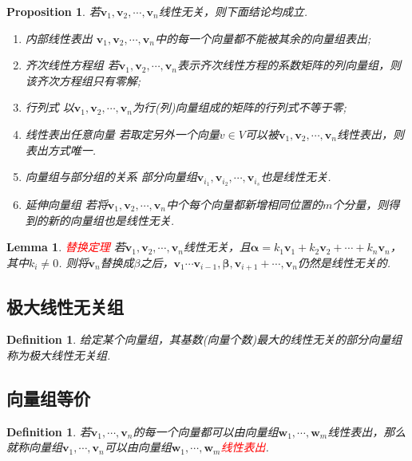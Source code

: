 \documentclass{article}
\newtheorem{lemma}[theorem]{Lemma}
\newtheorem{proposition}[theorem]{Proposition}
\newtheorem{definition}[theorem]{Definition}
\newcommand{\mbf}[1]{\bm{#1}}
\newcommand{\redt}[1]{\textcolor{red}{#1}}
\begin{document}
\begin{proposition}
\rm 若$\mbf{v}_1,\mbf{v}_2,\cdots,\mbf{v}_n$线性无关，则下面结论均成立.
\begin{enumerate}
	\item {\color{red} 内部线性表出} $\mbf{v}_1,\mbf{v}_2,\cdots,\mbf{v}_n$中的每一个向量都不能被其余的向量组表出;
	\item {\color{red} 齐次线性方程组} 若$\mbf{v}_1,\mbf{v}_2,\cdots,\mbf{v}_n$表示齐次线性方程的系数矩阵的列向量组，则该齐次方程组只有零解;
	\item {\color{red} 行列式} 以$\mbf{v}_1,\mbf{v}_2,\cdots,\mbf{v}_n$为行(列)向量组成的矩阵的行列式不等于零;
	\item {\color{red} 线性表出任意向量} 若取定另外一个向量$v \in V$可以被$\mbf{v}_1,\mbf{v}_2,\cdots,\mbf{v}_n$线性表出，则表出方式唯一.
	\item {\color{red} 向量组与部分组的关系} 部分向量组$\mbf{v}_{i_1},\mbf{v}_{i_2},\cdots,\mbf{v}_{i_s}$也是线性无关. 
	\item {\color{red} 延伸向量组} 若将$\mbf{v}_1,\mbf{v}_2,\cdots,\mbf{v}_n$中个每个向量都新增相同位置的$m$个分量，则得到的新的向量组也是线性无关.
\end{enumerate}
\end{proposition}

\begin{lemma}
\rm \redt{替换定理} 若$\mbf{v}_1,\mbf{v}_2,\cdots,\mbf{v}_n$线性无关，且$\mbf{\alpha} = k_1\mbf{v}_1 + k_2\mbf{v}_2 + \cdots+ k_n\mbf{v}_n$，其中$k_i \neq 0$. 则将$\mbf{v}_n$替换成$\beta$之后，$\mbf{v}_1 \cdots \mbf{v}_{i-1}, \mbf{\beta} ,\mbf{v}_{i+1} + \cdots,\mbf{v}_n$仍然是线性无关的. 
\end{lemma}

\subsection{极大线性无关组}

\begin{definition}
\rm 给定某个向量组，其基数(向量个数)最大的线性无关的部分向量组称为极大线性无关组.
\end{definition}

\subsection{向量组等价}

\begin{definition}
\rm 若$\mbf{v}_1,\cdots,\mbf{v}_n$的每一个向量都可以由向量组$\mbf{w}_1,\cdots,\mbf{w}_m$线性表出，那么就称向量组$\mbf{v}_1,\cdots,\mbf{v}_n$可以由向量组$\mbf{w}_1,\cdots,\mbf{w}_m$\redt{线性表出}.
\end{definition}
\end{document}
